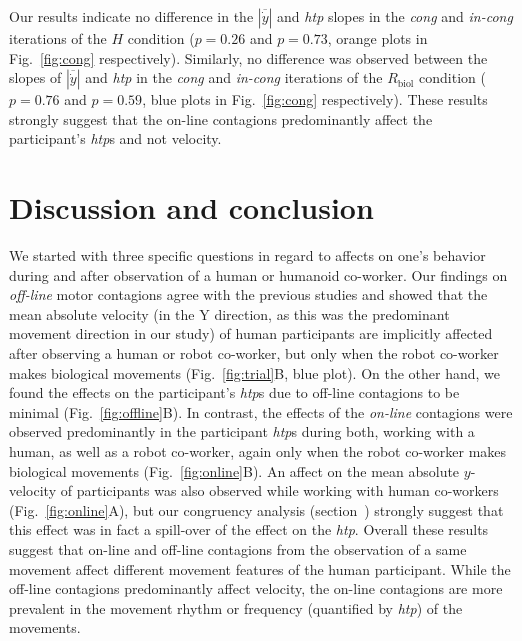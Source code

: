 Our results indicate no difference in the $|\overline{\dot{y}}|$ and {\it htp} slopes in the {\it cong} and {\it in-cong} iterations of the $H$ condition ($p = 0.26$ and $p = 0.73$, orange plots in Fig.~\ref{fig:cong} respectively). Similarly, no difference was observed between the slopes of $|\overline{\dot{y}}|$  and {\it htp} in the {\it cong} and {\it in-cong} iterations of the $R_{\text{biol}}$ condition ($p = 0.76$ and $p = 0.59$, blue plots in Fig.~\ref{fig:cong} respectively). These results strongly suggest that the on-line contagions predominantly affect the participant's {\it htp}s and not velocity.



\clearpage
\section{Discussion and conclusion}

We started with three specific questions in regard to affects on one's behavior during and after observation of a human or humanoid co-worker. Our findings on {\it off-line} motor contagions agree with the previous studies and showed that the mean absolute velocity (in the Y direction, as this was the predominant movement direction in our study) of human participants are implicitly affected after observing a human or robot co-worker, but only when the robot co-worker makes biological movements (Fig.~\ref{fig:trial}B, blue plot). On the other hand, we found the effects on the participant's {\it htp}s due to off-line contagions to be minimal (Fig.~\ref{fig:offline}B). In contrast, the effects of the {\it on-line} contagions were observed predominantly in the participant {\it htp}s during both, working with a human, as well as a robot co-worker, again only when the robot co-worker makes biological movements (Fig.~\ref{fig:online}B). An affect on the mean absolute $y$-velocity of participants was also observed while working with human co-workers (Fig.~\ref{fig:online}A), but our congruency analysis (section~) strongly suggest that this effect was in fact a spill-over of the effect on the {\it htp}.  Overall these results suggest that on-line and off-line contagions from the observation of a same movement affect different movement features of the human participant. While the off-line contagions predominantly affect velocity, the on-line contagions are more prevalent in the movement rhythm or frequency (quantified by {\it htp}) of the movements.

